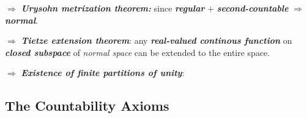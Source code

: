\documentclass[11pt]{article}
\begin{document}
\begin{itemize}
\begin{remark}
\begin{enumerate}
\qquad  $\Rightarrow$ \emph{\textbf{Urysohn metrization theorem:}} since  \emph{\textbf{regular}} $+$ \emph{\textbf{second-countable}} $\Rightarrow$ \emph{\textbf{normal}}.

\qquad $\Rightarrow$  \emph{\textbf{Tietze extension theorem}}: any \emph{\textbf{real-valued continous function}} on \emph{\textbf{closed subspace}} of \emph{normal space} can be extended to the entire space.

\qquad $\Rightarrow$ \emph{\textbf{Existence of finite partitions of unity}}: 
\end{enumerate}
\end{remark}
\end{itemize}

\subsection{The Countability Axioms}
\end{document}
